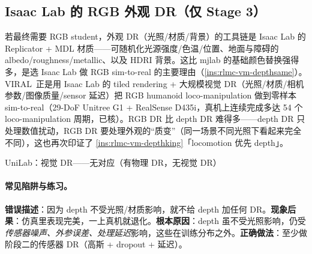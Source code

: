 \subsection{Isaac Lab 的 RGB 外观 DR（仅 Stage 3）}
\label{sec:rlmc-vm-rgbdr}

若最终需要 RGB student，外观 DR（光照/材质/背景）的工具链是 Isaac Lab 的 Replicator + MDL 材质——可随机化光源强度/色温/位置、地面与障碍的 albedo/roughness/metallic、以及 HDRI 背景。这比 mjlab 的基础颜色替换强得多，是选 Isaac Lab 做 RGB sim-to-real 的主要理由（\cref{ins:rlmc-vm-depthsame}）。VIRAL\,\cite{he2025viral} 正是用 Isaac Lab 的 tiled rendering + 大规模视觉 DR（光照/材质/相机参数/图像质量/sensor 延迟）把 RGB humanoid loco-manipulation 做到零样本 sim-to-real（29-DoF Unitree G1 + RealSense D435i，真机上连续完成多达 54 个 loco-manipulation 周期，已核）。RGB DR 比 depth DR 难得多——depth DR 只处理数值扰动，RGB DR 要处理外观的“质变”（同一场景不同光照下看起来完全不同），这也再次印证了 \cref{ins:rlmc-vm-depthking}「locomotion 优先 depth」。

\begin{codebox}[text]{UniLab：视觉 DR——无对应（有物理 DR，无视觉 DR）}
\end{codebox}

\paragraph{常见陷阱与练习。}

\begin{pitfall}
\textbf{错误描述}：因为 depth 不受光照/材质影响，就不给 depth 加任何 DR。\textbf{现象后果}：仿真里表现完美，一上真机就退化。\textbf{根本原因}：depth 虽不受光照影响，仍受\emph{传感器噪声、外参误差、处理延迟}影响，这些在训练分布之外。\textbf{正确做法}：至少做阶段二的传感器 DR（高斯 + dropout + 延迟）。
\end{pitfall}

